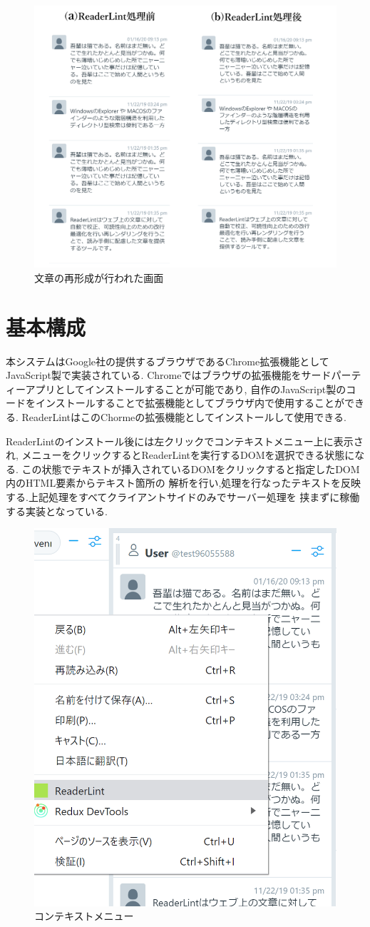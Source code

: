 \begin{figure}[H]
    \centering
    \label{fig:image11}
    \includegraphics[width=0.7\columnwidth]{image/03/img2.png}
    \caption[文章の再形成が行われた画面]{文章の再形成が行われた画面\footnotemark[1]}
\end{figure}


\section{基本構成}

本システムはGoogle社の提供するブラウザであるChrome拡張機能としてJavaScript製で実装されている.
Chromeではブラウザの拡張機能をサードパーティーアプリとしてインストールすることが可能であり,
自作のJavaScript製のコードをインストールすることで拡張機能としてブラウザ内で使用することができる.
ReaderLintはこのChormeの拡張機能としてインストールして使用できる.

ReaderLintのインストール後には左クリックでコンテキストメニュー上に表示され,
メニューをクリックするとReaderLintを実行するDOMを選択できる状態になる.
この状態でテキストが挿入されているDOMをクリックすると指定したDOM内のHTML要素からテキスト箇所の
解析を行い,処理を行なったテキストを反映する.上記処理をすべてクライアントサイドのみでサーバー処理を
挟まずに稼働する実装となっている.

\begin{figure}[H]
    \centering
    \label{fig:context}
    \includegraphics[width=0.4\columnwidth]{image/03/img0.png}
    \caption[コンテキストメニュー]{コンテキストメニュー}
\end{figure}

